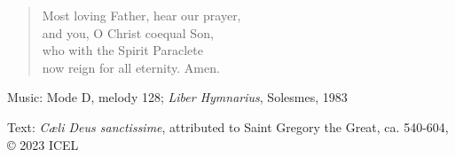 \hymn



\setlength{\leftmargini}{2em}
\begin{verse}
Most loving Father, hear our prayer,\\
and you, O Christ coequal Son,\\
who with the Spirit Paraclete\\
now reign for all eternity. Amen.
\end{verse}
\setlength{\leftmargini}{\defleftmargini}

\begin{hymnsource}
Music: Mode D, melody 128; \emph{Liber Hymnarius}, Solesmes, 1983

Text: \emph{Cæli Deus sanctissime}, attributed to Saint Gregory the Great, ca. 540-604, © 2023 ICEL
\end{hymnsource}
